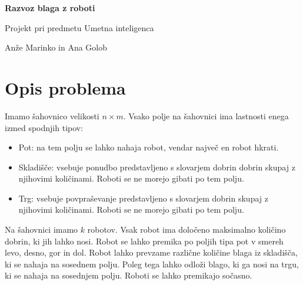 \documentclass[a4paper,12pt]{article} %
\begin{document}
\begin{center}
\begin{Large}
\textbf{Razvoz blaga z roboti}\\
\end{Large}
\begin{large}
Projekt pri predmetu Umetna inteligenca\\
\vspace{3mm}
\end{large}
Anže Marinko in  Ana Golob
\end{center}

\section{Opis problema}



Imamo šahovnico velikosti $n \times m$. Vsako polje na šahovnici ima lastnosti enega izmed spodnjih tipov:

\begin{itemize}

\item Pot: na tem polju se lahko nahaja robot, vendar največ en robot hkrati.

\item Skladišče: vsebuje ponudbo predstavljeno s slovarjem dobrin dobrin skupaj z njihovimi količinami. Roboti se ne morejo gibati po tem polju.

\item Trg: vsebuje povpraševanje predstavljeno s slovarjem dobrin skupaj z njihovimi količinami. Roboti se ne morejo gibati po tem polju.

\end{itemize}

Na šahovnici imamo $k$ robotov. Vsak robot ima določeno maksimalno količino dobrin, ki jih lahko nosi. Robot se lahko premika po poljih tipa pot v smereh levo, desno, gor in dol. Robot lahko prevzame različne količine blaga iz skladišča, ki se nahaja na sosednem polju. Poleg tega lahko odloži blago, ki ga nosi na trgu, ki se nahaja na sosednjem polju. Roboti se lahko premikajo sočasno.\vspace{3mm}

\\
\vspace{2mm}
\end{document}
